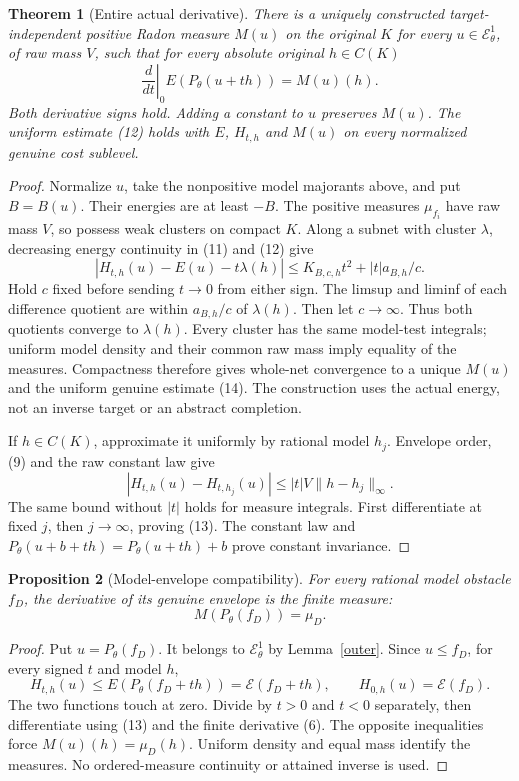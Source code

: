 \documentclass[11pt]{article}
\newtheorem{theorem}{Theorem}
\newtheorem{proposition}[theorem]{Proposition}
\newcommand{\EE}{\mathcal E^1_\theta}
\begin{document}
\begin{theorem}[Entire actual derivative]\label{derivative}
There is a uniquely constructed target-independent positive Radon
measure $M(u)$ on the original $K$ for every $u\in\EE$, of raw
mass $V$, such that for every absolute original $h\in C(K)$
\[
 \left.\frac{d}{dt}\right|_{0}E(P_\theta(u+th))=M(u)(h).
                                                        \tag{13}
\]
Both derivative signs hold. Adding a constant to $u$ preserves $M(u)$.
The uniform estimate (12) holds with $E$, $H_{t,h}$ and $M(u)$
on every normalized genuine cost sublevel.
\end{theorem}
\begin{proof}
Normalize $u$, take the nonpositive model majorants above, and put
$B=B(u)$. Their energies are at least $-B$.
The positive measures $\mu_{f_i}$ have raw mass $V$, so possess
weak clusters on compact $K$. Along a subnet with cluster $\lambda$,
decreasing energy continuity in (11) and (12) give
\[
 |H_{t,h}(u)-E(u)-t\lambda(h)|
       \leq K_{B,c,h}t^2+|t|a_{B,h}/c.                  \tag{14}
\]
Hold $c$ fixed before sending $t\to0$ from either sign.
The limsup and liminf of each difference quotient are within
$a_{B,h}/c$ of $\lambda(h)$. Then let $c\to\infty$.
Thus both quotients converge to $\lambda(h)$.
Every cluster has the same model-test integrals; uniform model
density and their common raw mass imply equality of the measures.
Compactness therefore gives whole-net convergence to a unique
$M(u)$ and the uniform genuine estimate (14).
The construction uses the actual energy, not an inverse target or
an abstract completion.

If $h\in C(K)$, approximate it uniformly by rational model $h_j$.
Envelope order, (9) and the raw constant law give
\[
 |H_{t,h}(u)-H_{t,h_j}(u)|
       \leq |t|V\|h-h_j\|_\infty.
\]
The same bound without $|t|$ holds for measure integrals.
First differentiate at fixed $j$, then $j\to\infty$, proving
(13). The constant law and
$P_\theta(u+b+th)=P_\theta(u+th)+b$ prove constant invariance.
\end{proof}

\begin{proposition}[Model-envelope compatibility]\label{touch}
For every rational model obstacle $f_D$, the derivative of its genuine
envelope is the finite measure:
\[
                         M(P_\theta(f_D))=\mu_D.
\]
\end{proposition}
\begin{proof}
Put $u=P_\theta(f_D)$. It belongs to $\EE$ by Lemma~\ref{outer}.
Since $u\leq f_D$, for every signed $t$ and model $h$,
\[
 H_{t,h}(u)\leq E(P_\theta(f_D+th))=\mathscr E(f_D+th),
 \qquad H_{0,h}(u)=\mathscr E(f_D).
\]
The two functions touch at zero. Divide by $t>0$ and $t<0$
separately, then differentiate using (13) and the finite derivative
(6). The opposite inequalities force $M(u)(h)=\mu_D(h)$.
Uniform density and equal mass identify the measures.
No ordered-measure continuity or attained inverse is used.
\end{proof}
\end{document}
